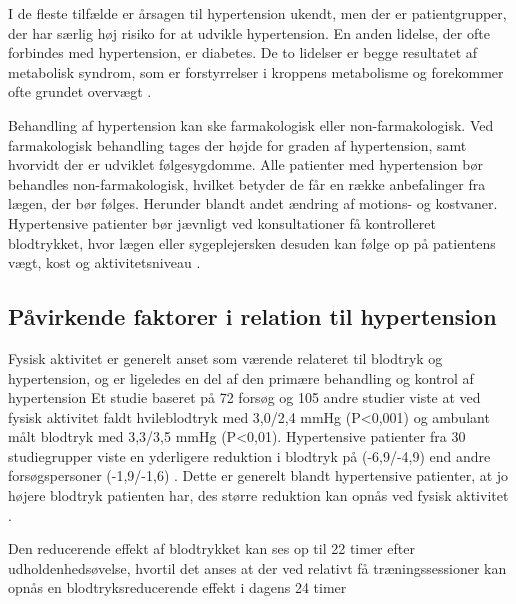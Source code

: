 I de fleste tilfælde er årsagen til hypertension ukendt, men der er patientgrupper, der har særlig høj risiko for at udvikle hypertension. En anden lidelse, der ofte forbindes med hypertension, er diabetes. De to lidelser er begge resultatet af metabolisk syndrom, som er forstyrrelser i kroppens metabolisme og forekommer ofte grundet overvægt \cite{cheung2012}.

Behandling af hypertension kan ske farmakologisk eller non-farmakologisk. Ved farmakologisk behandling tages der højde for graden af hypertension, samt hvorvidt der er udviklet følgesygdomme. Alle patienter med hypertension bør behandles non-farmakologisk, hvilket betyder de får en række anbefalinger fra lægen, der bør følges. Herunder blandt andet ændring af motions- og kostvaner. Hypertensive patienter bør jævnligt ved konsultationer få kontrolleret blodtrykket, hvor lægen eller sygeplejersken desuden kan følge op på patientens vægt, kost og aktivitetsniveau \cite{lodberg2016, bech2015}. 

\subsection{Påvirkende faktorer i relation til hypertension}

Fysisk aktivitet er generelt anset som værende relateret til blodtryk og hypertension, og er ligeledes en del af den primære behandling og kontrol af hypertension \citep{pescatello2004, fagard2006}
Et studie baseret på 72 forsøg og 105 andre studier viste at ved fysisk aktivitet faldt hvileblodtryk med 3,0/2,4 mmHg (P<0,001) og ambulant målt blodtryk med 3,3/3,5 mmHg (P<0,01). 
Hypertensive patienter fra 30 studiegrupper viste en yderligere reduktion i blodtryk på (-6,9/-4,9) end andre forsøgspersoner (-1,9/-1,6) \citep{fagard2006}. 
Dette er generelt blandt hypertensive patienter, at jo højere blodtryk patienten har, des større reduktion kan opnås ved fysisk aktivitet \citep{pedersen2011, pescatello2004}.

Den reducerende effekt af blodtrykket kan ses op til 22 timer efter udholdenhedsøvelse, hvortil det anses at der ved relativt få træningssessioner kan opnås en blodtryksreducerende effekt i dagens 24 timer \citep{pescatello2004} 


